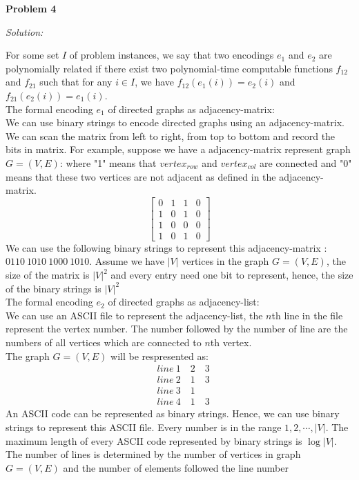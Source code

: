 \documentclass[12pt,letterpaper]{article}
\def\pp{\par\noindent}
\newcommand{\problem}[1]{ \bigskip \pp \textbf{Problem #1}\par}
\newcommand{\solution}{\textit{Solution:}\par}
\begin{document}
\problem{4}
\solution
For some set $I$ of problem instances, we say that two encodings $e_1$ and $e_2$ are polynomially related if there exist two polynomial-time computable
functions $f_{12}$ and $f_{21}$ such that for any $i \in I$, we have $f_{12}(e_1(i)) = e_2(i)$ and $f_{21}(e_2(i)) = e_1(i)$. \\
The formal encoding $e_1$ of directed graphs as adjacency-matrix: \\
We can use binary strings to encode directed graphs using an adjacency-matrix. We can scan the matrix from left to right, from top to bottom and record
the bits in matrix. For example, suppose we have a adjacency-matrix represent graph $G=(V,E)$: where "1" means that $vertex_{row}$ and $vertex_{col}$ are connected and
"0" means that these two vertices are not adjacent as defined in the adjacency-matrix.
\[
\begin{bmatrix}
    0 & 1 & 1 & 0 \\
    1 & 0 & 1 & 0 \\
    1 & 0 & 0 & 0 \\
    1 & 0 & 1 & 0
\end{bmatrix}
\]
We can use the following binary strings to represent this adjacency-matrix : $0110\ 1010\ 1000\ 1010$.
Assume we have $|V|$ vertices in the graph $G=(V,E)$, the size of the matrix is $|V|^2$ and every entry
need one bit to represent, hence, the size of the binary strings is $|V|^2$ \\
The formal encoding $e_2$ of directed graphs as adjacency-list: \\
We can use an ASCII file to represent the adjacency-list, the $n$th line in the file represent the vertex number.
The number followed by the number of line are the numbers of all vertices which are connected to $n$th vertex. \\
The graph $G=(V,E)$ will be respresented as:
\begin{align*}
&line\ 1\quad 2\quad 3 \\
&line\ 2\quad 1\quad 3 \\
&line\ 3\quad 1\quad \\
&line\ 4\quad 1\quad 3
\end{align*}
An ASCII code can be represented as binary strings. Hence, we can use binary strings to represent this ASCII file.
Every number is in the range $1,2,\cdots,|V|$. The maximum length of every ASCII code represented by binary strings is $\log |V|$.
The number of lines is determined by the number of vertices in graph $G=(V,E)$ and the number of elements followed the line number
\end{document}
